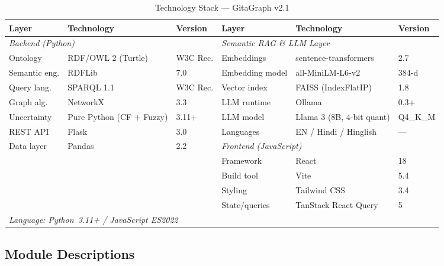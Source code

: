 \documentclass[conference]{IEEEtran}
\begin{document}
\begin{table}[!t]
\caption{Technology Stack — GitaGraph v2.1}
\label{tab:tech}
\centering
\begin{tabular}{@{}l l l  l l l@{}}
\toprule
\textbf{Layer} & \textbf{Technology} & \textbf{Version} &
\textbf{Layer} & \textbf{Technology} & \textbf{Version} \\
\midrule
\multicolumn{3}{l}{\textit{Backend (Python)}} & \multicolumn{3}{l}{\textit{Semantic RAG \& LLM Layer}} \\
Ontology       & RDF/OWL 2 (Turtle)       & W3C Rec.       & Embeddings        & sentence-transformers     & 2.7 \\
Semantic eng.  & RDFLib                   & 7.0            & Embedding model   & all-MiniLM-L6-v2          & 384-d \\
Query lang.    & SPARQL 1.1               & W3C Rec.       & Vector index      & FAISS (IndexFlatIP)       & 1.8 \\
Graph alg.     & NetworkX                 & 3.3            & LLM runtime       & Ollama                    & 0.3+ \\
Uncertainty    & Pure Python (CF + Fuzzy) & 3.11+          & LLM model         & Llama 3 (8B, 4-bit quant) & Q4\_K\_M \\
REST API       & Flask                    & 3.0            & Languages         & EN / Hindi / Hinglish     & — \\
Data layer     & Pandas                   & 2.2            & \multicolumn{3}{l}{\textit{Frontend (JavaScript)}} \\
               &                          &                & Framework         & React                     & 18 \\
\multicolumn{3}{l}{}                                     & Build tool        & Vite                      & 5.4 \\
\multicolumn{3}{l}{}                                     & Styling           & Tailwind CSS              & 3.4 \\
\multicolumn{3}{l}{}                                     & State/queries     & TanStack React Query      & 5 \\
\midrule
\multicolumn{6}{l}{\textit{Language: Python~3.11+ / JavaScript ES2022}} \\
\bottomrule
\end{tabular}
\end{table}

\subsection{Module Descriptions}
\end{document}
